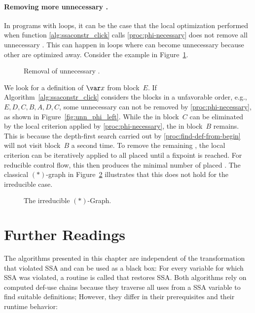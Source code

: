 {\paragraph{Removing more unnecessary \phifuns.}

In programs with loops, it can be the case that the local optimization performed when function \ref{alg:ssaconstr_click} calls \ref{proc:phi-necessary} does not remove all unnecessary \phifuns.
This can happen in loops where \phifuns can become unnecessary because other \phifuns are optimized away.
Consider the example in Figure~\ref{fig:phiopt}.
\begin{figure}[htbp]
	\begin{center}
		\qquad
	\end{center}
	\caption{Removal of unnecessary \phifuns.}
	\label{fig:phiopt}
\end{figure}
We look for a definition of $\var x$ from block~$E$.
If Algorithm~\ref{alg:ssaconstr_click} considers the blocks in a unfavorable order, e.g., $E,D,C,B,A,D,C$, some unnecessary \phifuns can not be removed by \ref{proc:phi-necessary}, as shown in Figure~\ref{fig:unn_phi_left}.
While the \phifun in block~$C$ can be eliminated by the local criterion applied by \ref{proc:phi-necessary}, the \phifun in block~$B$ remains.
This is because the depth-first search carried out by \ref{proc:find-def-from-begin} will not visit block~$B$ a second time.
To remove the remaining \phifuns, the local criterion can be iteratively applied to all placed \phifuns until a fixpoint is reached.
For reducible control flow, this then produces the minimal number of placed \phifuns.
The classical $(\ast)$-graph in Figure~\ref{fig:astgraph} illustrates that this does not hold for the irreducible case.

\begin{figure}
    \hfil{}\hfil\strut
    \caption{The irreducible $(\ast)$-Graph.}
    \label{fig:astgraph}
\end{figure}



\section{Further Readings}

The algorithms presented in this chapter are independent of the transformation that violated SSA and can be used as a black box:
For every variable for which SSA was violated, a routine is called that restores SSA.
Both algorithms rely on computed def-use chains because they traverse all uses from a SSA variable to find suitable definitions;
However, they differ in their prerequisites and their runtime behavior:

}
